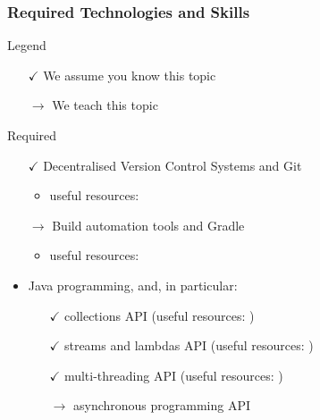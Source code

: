 \documentclass[presentation]{beamer}\mode<presentation>{\usetheme{AMSCesenaPurpleAndGold}}
\begin{document}
\begin{frame}[allowframebreaks]
	\frametitle{Required Technologies and Skills}

	\begin{block}{Legend}
		\begin{multicols}{2}
			\begin{itemize}
				\item[$\checkmark$] We assume you know this topic
				\item[$\rightarrow$] We teach this topic
			\end{itemize}
		\end{multicols}
	\end{block}

	\begin{alertblock}{Required}
		\begin{itemize}
			\item[$\checkmark$] Decentralised Version Control Systems and \alert{Git}
			\begin{itemize}
				\item useful resources: 
			\end{itemize}

			\vfill

			\item[$\rightarrow$] Build automation tools and \alert{Gradle}
			\begin{itemize}
				\item useful resources: 
			\end{itemize}

			\vfill

			\item Java programming, and, in particular:
			\begin{itemize}
				\item[$\checkmark$] collections API (useful resources: )
				\item[$\checkmark$] streams and lambdas API (useful resources: )
				\item[$\checkmark$] multi-threading API (useful resources: )
				\item[$\rightarrow$] asynchronous programming API
			\end{itemize}

		\end{itemize}
	\end{alertblock}


\end{frame}
\end{document}
